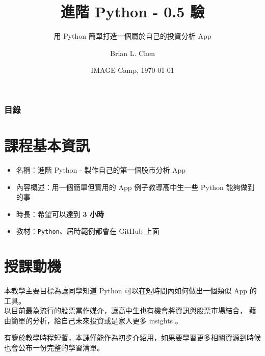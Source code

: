 \documentclass{beamer}
\title{進階 Python - 0.5 驗}
\subtitle{用 Python 簡單打造一個屬於自己的投資分析 App}
\author{Brian L. Chen}
\institute{
  Department of Information Management\\
  National Taiwan University
}
\date{IMAGE Camp, \today}
\newcommand{\code}[1]{\texttt{\textcolor{pinky}{#1}}}
\begin{document}
\frame{\titlepage}


\begin{frame}
\frametitle{目錄}
\tableofcontents
\end{frame}

\section{課程基本資訊}

\begin{frame}
  \begin{itemize}
    \item 名稱：進階 Python - 製作自己的第一個股市分析 App\footnotemark
    \item 內容概述：用一個簡單但實用的 App 例子教導高中生一些 Python 能夠做到的事
    \item 時長：希望可以達到 \alert{\textbf{3 小時}}
    \item 教材：\code{Python}、屆時範例都會在 GitHub 上面\footnotemark
  \end{itemize}

\end{frame}


\section{授課動機}

\begin{frame}
  本教學主要目標為讓同學知道 Python 可以在短時間內如何做出一個類似 App 的工具。\\
  以目前最為流行的股票當作媒介，讓高中生也有機會將資訊與股票市場結合，
  藉由簡單的分析，給自己未來投資或是家人更多 insights 。
  
  \vspace{5mm} %
  
  有鑒於教學時程短暫，本課僅能作為初步介紹用，如果要學習更多相關資源到時候也會公布一份完整的學習清單。
\end{frame}
\end{document}
